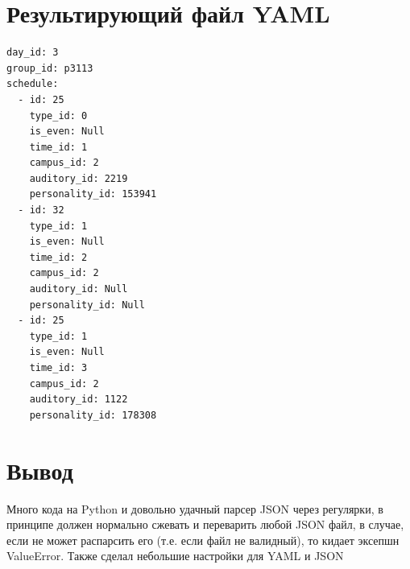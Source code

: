 \documentclass[11pt]{article}
\begin{document}
\section{Результирующий файл YAML}
\label{sec:orgae15bd6}
\lstset{language=yaml,label= ,caption= ,captionpos=b,numbers=none}
\begin{lstlisting}
day_id: 3
group_id: p3113
schedule: 
  - id: 25
    type_id: 0
    is_even: Null
    time_id: 1
    campus_id: 2
    auditory_id: 2219
    personality_id: 153941
  - id: 32
    type_id: 1
    is_even: Null
    time_id: 2
    campus_id: 2
    auditory_id: Null
    personality_id: Null
  - id: 25
    type_id: 1
    is_even: Null
    time_id: 3
    campus_id: 2
    auditory_id: 1122
    personality_id: 178308
\end{lstlisting}
\section{Вывод}
\label{sec:org2b84d86}
\normalsize
Много кода на Python и довольно удачный парсер JSON через регулярки, в принципе должен нормально сжевать и переварить любой JSON файл, в случае, если не может распарсить его (т.е. если файл не валидный), то кидает эксепшн ValueError.
Также сделал небольшие настройки для YAML и JSON
\end{document}
